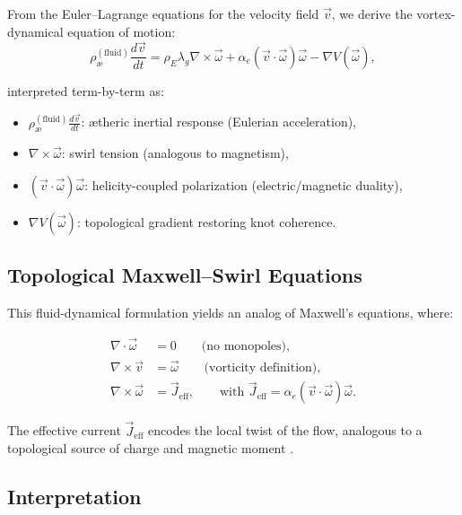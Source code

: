 From the Euler--Lagrange equations for the velocity field \( \vec{v} \), we derive the vortex-dynamical equation of motion:
\begin{equation}
\label{eq:VAM_dynamics}
\rho_\text{\ae}^{(\text{fluid})} \frac{d \vec{v}}{dt} =
\rho_{\scriptscriptstyle\boldsymbol\!E}\lambda_g \nabla \times \vec{\omega}
+ \alpha_e (\vec{v} \cdot \vec{\omega}) \vec{\omega}
- \nabla V(\vec{\omega}),
\end{equation}

interpreted term-by-term as:
\begin{itemize}
    \item \( \rho_\text{\ae}^{(\text{fluid})} \frac{d \vec{v}}{dt} \): ætheric inertial response (Eulerian acceleration),
    \item \( \nabla \times \vec{\omega} \): swirl tension (analogous to magnetism),
    \item \( (\vec{v} \cdot \vec{\omega}) \vec{\omega} \): helicity-coupled polarization (electric/magnetic duality),
    \item \( \nabla V(\vec{\omega}) \): topological gradient restoring knot coherence.
\end{itemize}

\subsection*{Topological Maxwell–Swirl Equations}

This fluid-dynamical formulation yields an analog of Maxwell’s equations, where:

\begin{align}
\nabla \cdot \vec{\omega} &= 0 \qquad \text{(no monopoles)}, \label{eq:divB} \\
\nabla \times \vec{v} &= \vec{\omega} \qquad \text{(vorticity definition)}, \label{eq:curlE} \\
\nabla \times \vec{\omega} &= \vec{J}_\text{eff}, \qquad \text{with } \vec{J}_\text{eff} = \alpha_e (\vec{v} \cdot \vec{\omega}) \vec{\omega}. \label{eq:ampere}
\end{align}

The effective current \( \vec{J}_\text{eff} \) encodes the local twist of the flow, analogous to a topological source of charge and magnetic moment \cite{yakovenko2021fluid, finn2020helicity}.

\subsection*{Interpretation}

